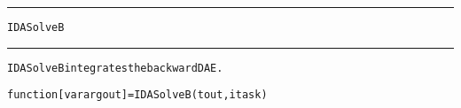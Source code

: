 \begin{samepage}
\hrule
\begin{center}
{\large \verb!IDASolveB!}
\label{p:IDASolveB}
\end{center}
\hrule\vspace{0.1in}



\begin{alltt}
IDASolveB integrates the backward DAE.
\end{alltt}

\end{samepage}



\begin{samepage}


\begin{alltt}
function [varargout] = IDASolveB(tout,itask) 
\end{alltt}

\end{samepage}



